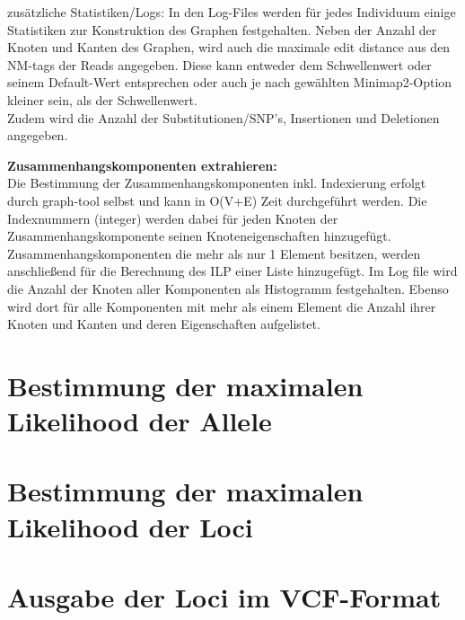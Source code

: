 zusätzliche Statistiken/Logs:
    In den Log-Files werden für jedes Individuum einige Statistiken zur Konstruktion des Graphen festgehalten. Neben der Anzahl der Knoten und Kanten des Graphen, wird auch die maximale edit distance aus den NM-tags der Reads angegeben. Diese kann entweder dem Schwellenwert oder seinem Default-Wert entsprechen oder auch je nach gewählten Minimap2-Option kleiner sein, als der Schwellenwert. \\
    Zudem wird die Anzahl der Substitutionen/SNP's, Insertionen und Deletionen angegeben.
    
\textbf{Zusammenhangskomponenten extrahieren:} \\
    Die Bestimmung der Zusammenhangskomponenten inkl. Indexierung erfolgt durch graph-tool selbst und kann in O(V+E) Zeit durchgeführt werden. Die Indexnummern (integer) werden dabei für jeden Knoten der Zusammenhangskomponente seinen Knoteneigenschaften hinzugefügt. Zusammenhangskomponenten die mehr als nur 1 Element besitzen, werden anschließend für die Berechnung des ILP einer Liste hinzugefügt. Im Log file wird die Anzahl der Knoten aller Komponenten als Histogramm festgehalten. Ebenso wird dort für alle Komponenten mit mehr als einem Element die Anzahl ihrer Knoten und Kanten und deren Eigenschaften aufgelistet.

\section{Bestimmung der maximalen Likelihood der Allele} \label{sec:}
\subsection{} \label{subsec:}


\section{Bestimmung der maximalen Likelihood der Loci} \label{sec:}
\subsection{} \label{subsec:}


\section{Ausgabe der Loci im VCF-Format} \label{sec:}
\subsection{} \label{subsec:}
